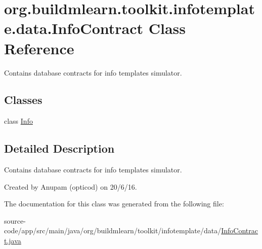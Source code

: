 \hypertarget{classorg_1_1buildmlearn_1_1toolkit_1_1infotemplate_1_1data_1_1InfoContract}{}\section{org.\+buildmlearn.\+toolkit.\+infotemplate.\+data.\+Info\+Contract Class Reference}
\label{classorg_1_1buildmlearn_1_1toolkit_1_1infotemplate_1_1data_1_1InfoContract}


Contains database contracts for info template\textquotesingle{}s simulator.  


\subsection*{Classes}
\begin{DoxyCompactItemize}
\item 
class \hyperlink{classorg_1_1buildmlearn_1_1toolkit_1_1infotemplate_1_1data_1_1InfoContract_1_1Info}{Info}
\end{DoxyCompactItemize}


\subsection{Detailed Description}
Contains database contracts for info template\textquotesingle{}s simulator. 

Created by Anupam (opticod) on 20/6/16. 

The documentation for this class was generated from the following file\+:\begin{DoxyCompactItemize}
\item 
source-\/code/app/src/main/java/org/buildmlearn/toolkit/infotemplate/data/\hyperlink{InfoContract_8java}{Info\+Contract.\+java}\end{DoxyCompactItemize}
